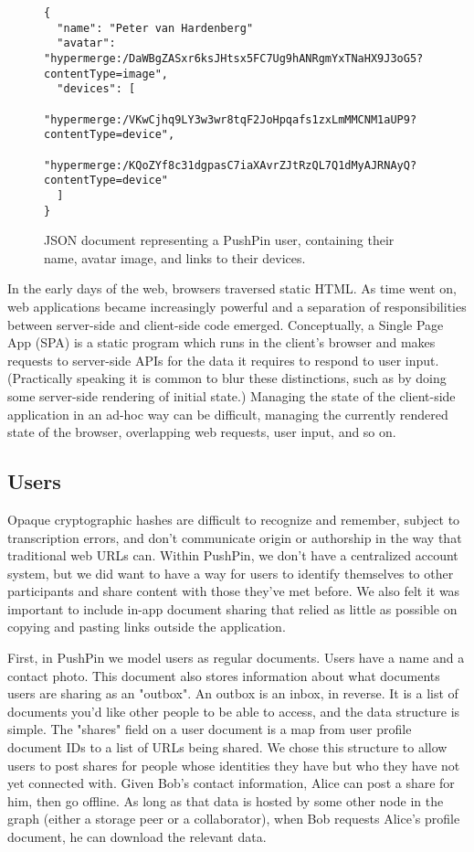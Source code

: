 \begin{figure*}
\begin{verbatim}
{
  "name": "Peter van Hardenberg"
  "avatar": "hypermerge:/DaWBgZASxr6ksJHtsx5FC7Ug9hANRgmYxTNaHX9J3oG5?contentType=image",
  "devices": [
    "hypermerge:/VKwCjhq9LY3w3wr8tqF2JoHpqafs1zxLmMMCNM1aUP9?contentType=device",
    "hypermerge:/KQoZYf8c31dgpasC7iaXAvrZJtRzQL7Q1dMyAJRNAyQ?contentType=device"
  ]
}
\end{verbatim}
\caption{JSON document representing a PushPin user, containing their name, avatar image, and links to their devices.}
\label{fig:user-json}
\end{figure*}

In the early days of the web, browsers traversed static HTML. As time went on, web applications became increasingly powerful and a separation of responsibilities between server-side and client-side code emerged. Conceptually, a Single Page App (SPA) is a static program which runs in the client's browser and makes requests to server-side APIs for the data it requires to respond to user input. (Practically speaking it is common to blur these distinctions, such as by doing some server-side rendering of initial state.) Managing the state of the client-side application in an ad-hoc way can be difficult, managing the currently rendered state of the browser, overlapping web requests, user input, and so on. 


\subsection{Users}

Opaque cryptographic hashes are difficult to recognize and remember, subject to transcription errors, and don't communicate origin or authorship in the way that traditional web URLs can. Within PushPin, we don't have a centralized account system, but we did want to have a way for users to identify themselves to other participants and share content with those they've met before. We also felt it was important to include in-app document sharing that relied as little as possible on copying and pasting links outside the application.

First, in PushPin we model users as regular documents. Users have a name and a contact photo. This document also stores information about what documents users are sharing as an "outbox". An outbox is an inbox, in reverse. It is a list of documents you'd like other people to be able to access, and the data structure is simple. The "shares" field on a user document is a map from user profile document IDs to a list of URLs being shared. We chose this structure to allow users to post shares for people whose identities they have but who they have not yet connected with. Given Bob's contact information, Alice can post a share for him, then go offline. As long as that data is hosted by some other node in the graph (either a storage peer or a collaborator), when Bob requests Alice's profile document, he can download the relevant data.


